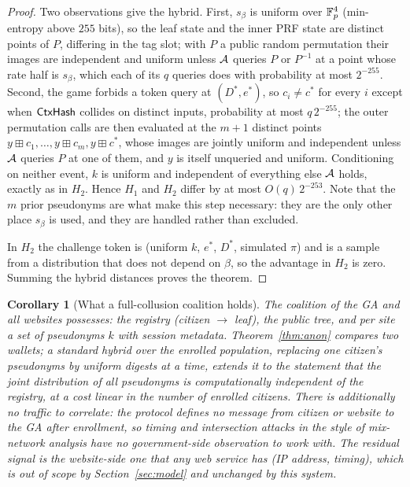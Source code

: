 \documentclass[11pt]{article}
\newtheorem{corollary}{Corollary}
\theoremstyle{definition}
\begin{document}
\begin{proof}
Two observations give the hybrid. First, $s_\beta$ is uniform over $\mathbb{F}_p^4$ (min-entropy
above $255$ bits), so the leaf state and the inner PRF state are distinct points of $P$,
differing in the tag slot; with $P$ a public random permutation their images are
independent and uniform unless $\mathcal{A}$ queries $P$ or $P^{-1}$ at a point whose rate half
is $s_\beta$, which each of its $q$ queries does with probability at most $2^{-255}$.
Second, the game forbids a token query at $(D^*, e^*)$, so $c_i \ne c^*$ for every $i$
except when $\mathsf{CtxHash}$ collides on distinct inputs, probability at most $q\,2^{-255}$;
the outer permutation calls are then evaluated at the $m+1$ distinct points $y \boxplus
c_1, \ldots, y \boxplus c_m, y \boxplus c^*$, whose images are jointly uniform and
independent unless $\mathcal{A}$ queries $P$ at one of them, and $y$ is itself unqueried and
uniform. Conditioning on neither event, $k$ is uniform and independent of everything else
$\mathcal{A}$ holds, exactly as in $H_2$. Hence $H_1$ and $H_2$ differ by at most
$O(q)\,2^{-253}$. Note that the $m$ prior pseudonyms are what make this step necessary:
they are the only other place $s_\beta$ is used, and they are handled rather than
excluded.

In $H_2$ the challenge token is (uniform $k$, $e^*$, $D^*$, simulated $\pi$) and is a
sample from a distribution that does not depend on $\beta$, so the advantage in $H_2$ is
zero. Summing the hybrid distances proves the theorem.
\end{proof}

\begin{corollary}[What a full-collusion coalition holds]
The coalition of the GA and all websites possesses: the registry (citizen $\to$ leaf), the
public tree, and per site a set of pseudonyms $k$ with session metadata. Theorem~\ref{thm:anon}
compares two wallets; a standard hybrid over the enrolled population, replacing one
citizen's pseudonyms by uniform digests at a time, extends it to the statement that the
joint distribution of all pseudonyms is computationally independent of the registry, at a
cost linear in the number of enrolled citizens. There is additionally no traffic to correlate: the protocol defines no
message from citizen or website to the GA after enrollment, so timing and intersection
attacks in the style of mix-network analysis have no government-side observation to work
with. The residual signal is the website-side one that any web service has (IP address,
timing), which is out of scope by Section~\ref{sec:model} and unchanged by this system.
\end{corollary}
\end{document}

